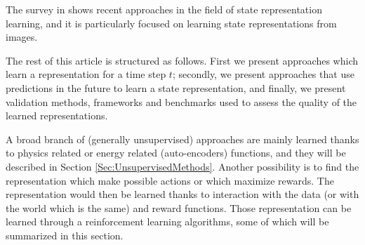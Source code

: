 \documentclass[a4paper]{article}
\begin{document}
The survey in \cite{Bohmer15} shows recent  approaches in the field of state representation learning, and it is particularly focused on learning state representations from images. 

The rest of this article is structured as follows. First we present approaches which learn a representation for a time step $t$; secondly, we present approaches that use predictions in the future to learn a state representation, and finally, we present validation methods, frameworks and benchmarks used to assess the quality of the learned representations.


A broad branch of (generally unsupervised) approaches are mainly learned thanks to physics related or energy related (auto-encoders) functions, and they will be described in Section \ref{Sec:UnsupervisedMethods}.  Another possibility is to find the representation which make possible actions or which maximize rewards. The representation would then be learned thanks to interaction with the data (or with the world which is the same) and reward functions. Those representation can be learned through a reinforcement learning algorithms, some of which will be summarized in this section.


\end{document}

